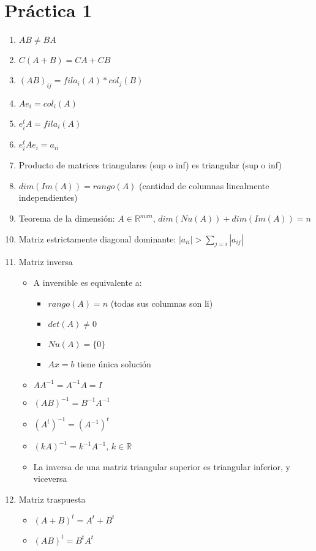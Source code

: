 \documentclass[10pt]{article}
\begin{document}
\section*{Práctica 1}
\begin{enumerate}
    \item $AB \neq BA$
    \item $C(A+B) = CA + CB$
    \item $(AB)_{ij} = fila_i(A)*col_j(B)$
    \item $Ae_{i} = col_i(A)$
    \item $e_i^tA = fila_i(A)$
    \item $e_i^tAe_i = a_{ii}$
    \item Producto de matrices triangulares (sup o inf) es triangular (sup o inf)
    \item $dim(Im(A)) = rango(A)$ (cantidad de columnas linealmente independientes)
    \item Teorema de la dimensión: $A \in \mathbb{R}^{mxn}$, $dim(Nu(A)) + dim(Im(A)) = n$
    \item Matriz estrictamente diagonal dominante: $|a_{ii}| > \sum_{j=i}{}|a_{ij}|$
    \item Matriz inversa
    \begin{itemize}
    \item A inversible es equivalente a:
        \begin{itemize}
        \item $rango(A) = n$ (todas sus columnas son li)
        \item $det(A)\neq0$
        \item $Nu(A) = \{0\}$
        \item $Ax=b$ tiene única solución
        \end{itemize}
    \item $AA^{-1} = A^{-1}A = I$
    \item $(AB)^{-1} = B^{-1}A^{-1}$
    \item $(A^t)^{-1} = (A^{-1})^t$
    \item $(kA)^{-1} = k^{-1} A^{-1}$, $k\in\mathbb{R}$
    \item La inversa de una matriz triangular superior es triangular inferior, y viceversa
    \end{itemize}
    \item Matriz traspuesta
    \begin{itemize}
        \item $(A+B)^t = A^t + B^t$
        \item $(AB)^t = B^tA^t$

\end{itemize}
\end{enumerate}
\end{document}
